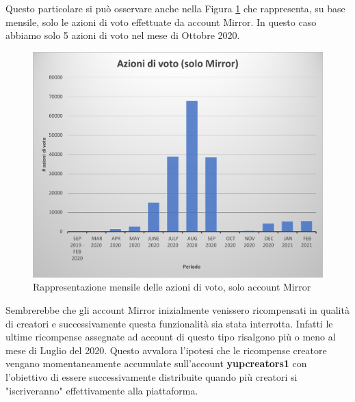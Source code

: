 Questo particolare si può osservare anche nella Figura \ref{fig: voting_onlymirr} che rappresenta, su base mensile, solo le azioni di voto effettuate da account Mirror. In questo caso abbiamo solo 5 azioni di voto nel mese di Ottobre 2020.

\begin{figure}[t]
    \centering
    \includegraphics[width=.7\textwidth]{graphs/azioni_voto_onlymirr.png}
    \caption{Rappresentazione mensile delle azioni di voto, solo account Mirror}
    \label{fig: voting_onlymirr}
\end{figure}

Sembrerebbe che gli account Mirror inizialmente venissero ricompensati in qualità di creatori e successivamente questa funzionalità sia stata interrotta. Infatti le ultime ricompense assegnate ad account di questo tipo risalgono più o meno al mese di Luglio del 2020. Questo avvalora l'ipotesi che le ricompense creatore vengano momentaneamente accumulate sull'account \textbf{yupcreators1} con l'obiettivo di essere successivamente distribuite quando più creatori si "iscriveranno" effettivamente alla piattaforma.

